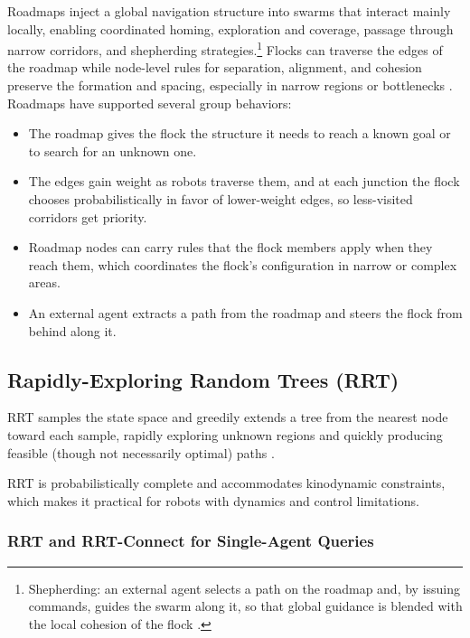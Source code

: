 Roadmaps inject a global navigation structure into swarms that interact mainly
locally, enabling coordinated homing, exploration and coverage, passage through
narrow corridors, and shepherding strategies.\footnote{Shepherding: an external
agent selects a path on the roadmap and, by issuing commands, guides the swarm
along it, so that global guidance is blended with the local cohesion of the
flock \cite{sahin2005swarm}.} Flocks can traverse the edges of the roadmap while node-level
rules for separation, alignment, and cohesion preserve the formation and spacing,
especially in narrow regions or bottlenecks \cite{sahin2005swarm}. Roadmaps have
supported several group behaviors:
\begin{itemize}
  \item {} The roadmap gives the flock the
        structure it needs to reach a known goal or to search for an unknown one.
  \item {} The edges gain weight as robots traverse
        them, and at each junction the flock chooses probabilistically in favor of
        lower-weight edges, so less-visited corridors get priority.
  \item {} Roadmap nodes can carry rules that the flock
        members apply when they reach them, which coordinates the flock's
        configuration in narrow or complex areas.
  \item {} An external agent extracts a path from the roadmap and
        steers the flock from behind along it.
\end{itemize}

\subsection{Rapidly-Exploring Random Trees (RRT)}

RRT samples the state space and greedily extends a tree from the nearest node
toward each sample, rapidly exploring unknown regions and quickly producing
feasible (though not necessarily optimal) paths
\cite{lavalle1998rapidly,abujabal2024path}.

RRT is probabilistically complete and accommodates kinodynamic constraints, which
makes it practical for robots with dynamics and control limitations.

\subsubsection{RRT and RRT-Connect for Single-Agent Queries}

